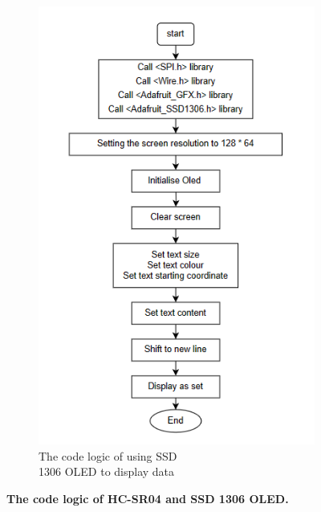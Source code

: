 \begin{landscape}
\begin{figure}[H]
\begin{subfigure}{0.52\textwidth}
            \includegraphics[width=\linewidth]{Image/Design/code_logic_display.png}
            \caption{\centering The code logic of using SSD \\1306 OLED to display data}
            \label{fig:cl_oled}
        \end{subfigure}
        \caption[]
        {\centering \textbf{The code logic of HC-SR04 and SSD 1306 OLED.}}
        \label{fig:cl_tof_oled}
    \end{figure}
\end{landscape}


\newpage